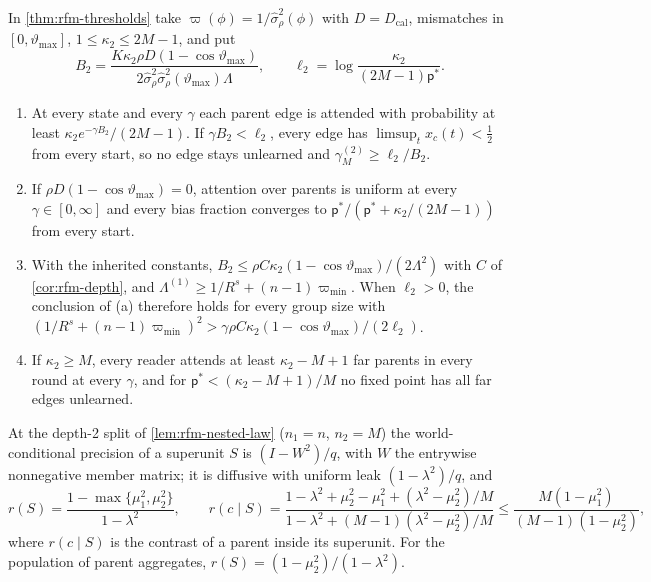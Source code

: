 \begin{theorem}\label{thm:rfm-obstruction}
In \cref{thm:rfm-thresholds} take $\varpi(\phi)=1/\hat\sigma^2_\rho(\phi)$ with $D=D_{\mathrm{cal}}$, mismatches in $[0,\vartheta_{\max}]$, $1\le\kappa_2\le2M-1$, and put
\begin{equation}\label{eq:rfm-b2}
B_2=\frac{K\kappa_2\rho D(1-\cos\vartheta_{\max})}{2\hat\sigma_\rho^2\hat\sigma_\rho^2(\vartheta_{\max})\Lambda},\qquad\ell_2=\log\frac{\kappa_2}{(2M-1)\mathsf p^\ast}.
\end{equation}
\begin{enumerate}
\item[(a)] At every state and every $\gamma$ each parent edge is attended with probability at least $\kappa_2e^{-\gamma B_2}/(2M-1)$. If $\gamma B_2<\ell_2$, every edge has $\limsup_tx_c(t)<\frac12$ from every start, so no edge stays unlearned and $\gamma_M^{(2)}\ge\ell_2/B_2$.
\item[(b)] If $\rho D(1-\cos\vartheta_{\max})=0$, attention over parents is uniform at every $\gamma\in[0,\infty]$ and every bias fraction converges to $\mathsf p^\ast/(\mathsf p^\ast+\kappa_2/(2M-1))$ from every start.
\item[(c)] With the inherited constants, $B_2\le\rho C\kappa_2(1-\cos\vartheta_{\max})/(2\Lambda^2)$ with $C$ of \cref{cor:rfm-depth}, and $\Lambda^{(1)}\ge1/R^s+(n-1)\varpi_{\min}$. When $\ell_2>0$, the conclusion of (a) therefore holds for every group size with $(1/R^s+(n-1)\varpi_{\min})^2>\gamma\rho C\kappa_2(1-\cos\vartheta_{\max})/(2\ell_2)$.
\item[(d)] If $\kappa_2\ge M$, every reader attends at least $\kappa_2-M+1$ far parents in every round at every $\gamma$, and for $\mathsf p^\ast<(\kappa_2-M+1)/M$ no fixed point has all far edges unlearned.
\end{enumerate}
\end{theorem}

\begin{proposition}\label{prop:rfm-replacement}
At the depth-2 split of \cref{lem:rfm-nested-law} ($n_1=n$, $n_2=M$) the world-conditional precision of a superunit $S$ is $(I-W^2)/q$, with $W$ the entrywise nonnegative member matrix; it is diffusive with uniform leak $(1-\lambda^2)/q$, and
\begin{equation}\label{eq:rfm-replacement}
r(S)=\frac{1-\max\{\mu_1^2,\mu_2^2\}}{1-\lambda^2},\qquad r(c\mid S)=\frac{1-\lambda^2+\mu_2^2-\mu_1^2+(\lambda^2-\mu_2^2)/M}{1-\lambda^2+(M-1)(\lambda^2-\mu_2^2)/M}\le\frac{M(1-\mu_1^2)}{(M-1)(1-\mu_2^2)},
\end{equation}
where $r(c\mid S)$ is the contrast of a parent inside its superunit. For the population of parent aggregates, $r(S)=(1-\mu_2^2)/(1-\lambda^2)$.
\end{proposition}

